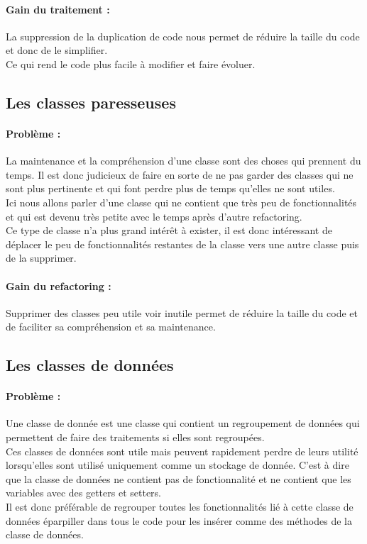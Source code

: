\documentclass[a4paper,twoside,12pt,openright]{report}
\begin{document}
\paragraph{Gain du traitement :}
La suppression de la duplication de code nous permet de réduire la taille du code et donc de le simplifier.\\
Ce qui rend le code plus facile à modifier et faire évoluer.\\

\subsection{Les classes paresseuses}
\paragraph{Problème :}
La maintenance et la compréhension d'une classe sont des choses qui prennent du temps. Il est donc judicieux de faire en sorte de ne pas garder des classes qui ne sont plus pertinente et qui font perdre plus de temps qu'elles ne sont utiles.\\
Ici nous allons parler d'une classe qui ne contient que très peu de fonctionnalités et qui est devenu très petite avec le temps après d'autre refactoring.\\


Ce type de classe n'a plus grand intérêt à exister, il est donc intéressant de déplacer le peu de fonctionnalités restantes de la classe vers une autre classe puis de la supprimer.\\

\paragraph{Gain du refactoring :}
Supprimer des classes peu utile voir inutile permet de réduire la taille du code et de faciliter sa compréhension et sa maintenance.\\

\subsection{Les classes de données}
\paragraph{Problème :}
Une classe de donnée est une classe qui contient un regroupement de données qui permettent de faire des traitements si elles sont regroupées.\\
Ces classes de données sont utile mais peuvent rapidement perdre de leurs utilité lorsqu'elles sont utilisé uniquement comme un stockage de donnée. C'est à dire que la classe de données ne contient pas de fonctionnalité et ne contient que les variables avec des getters et setters.\\
Il est donc préférable de regrouper toutes les fonctionnalités lié à cette classe de données éparpiller dans tous le code pour les insérer comme des méthodes de la classe de données.\\ 
\end{document}
